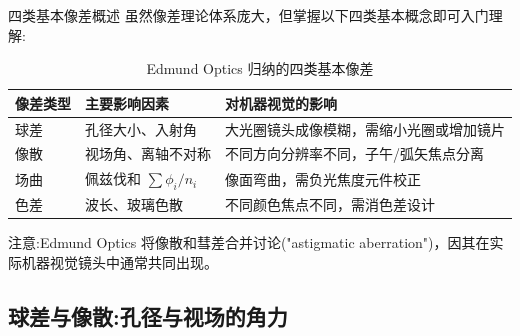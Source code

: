 \begin{frame}{四类基本像差概述}
    虽然像差理论体系庞大，但掌握以下四类基本概念即可入门理解:

    \begin{table}
        \centering
        \small
        \begin{tabular}{p{2.5cm}|p{3.5cm}|p{4.5cm}}
            \toprule
            \textbf{像差类型} & \textbf{主要影响因素} & \textbf{对机器视觉的影响} \\
            \midrule
            \alert{球差} & 孔径大小、入射角 & 大光圈镜头成像模糊，需缩小光圈或增加镜片 \\
            \alert{像散} & 视场角、离轴不对称 & 不同方向分辨率不同，子午/弧矢焦点分离 \\
            \alert{场曲} & 佩兹伐和 $\sum\phi_i/n_i$ & 像面弯曲，需负光焦度元件校正 \\
            \alert{色差} & 波长、玻璃色散 & 不同颜色焦点不同，需消色差设计 \\
            \bottomrule
        \end{tabular}
        \caption{Edmund Optics 归纳的四类基本像差}
        \label{tab:four_aberration_types}
    \end{table}

    \alert{注意:}Edmund Optics 将像散和彗差合并讨论("astigmatic aberration")，因其在实际机器视觉镜头中通常共同出现。
\end{frame}

\subsection{球差与像散:孔径与视场的角力}

